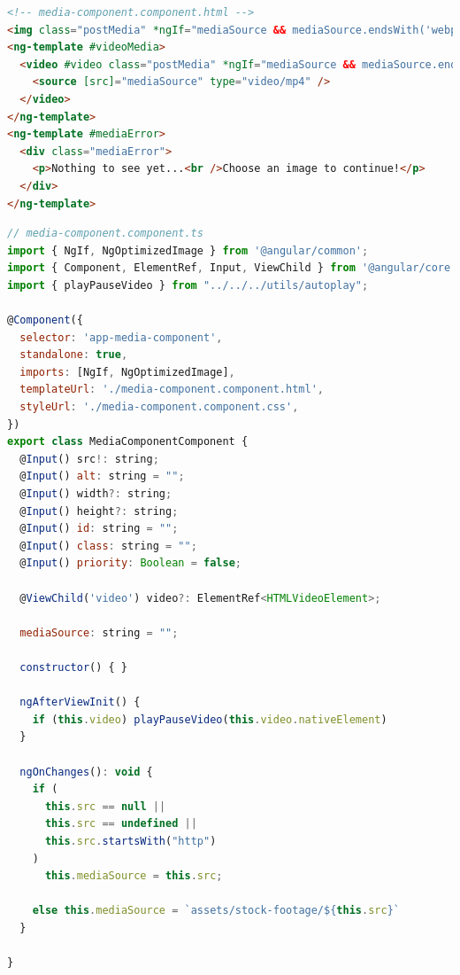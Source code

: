 \documentclass[a4paper, 10pt]{article}
\begin{document}
\begin{lstlisting}[caption=MediaComponent in Angular (Template), label={lst:Angular:MediaComponent:Template}, language=HTML]
<!-- media-component.component.html -->
<img class="postMedia" *ngIf="mediaSource && mediaSource.endsWith('webp'); else videoMedia" [ngSrc]="mediaSource" [alt]="alt" [width]="width?.endsWith('%') ? 600 : width" [height]="height || (width?.endsWith('%') ? 600 : width)" [id]="id" [class]="class" [sizes]="width!" [priority]="priority" />
<ng-template #videoMedia>
  <video #video class="postMedia" *ngIf="mediaSource && mediaSource.endsWith('mp4'); else mediaError" [attr.width]="width" controls controlslist="nodownload,nofullscreen,noremoteplayback" disablepictureinpicture loop [muted]="true" preload="metadata" >
    <source [src]="mediaSource" type="video/mp4" />
  </video>
</ng-template>
<ng-template #mediaError>
  <div class="mediaError">
    <p>Nothing to see yet...<br />Choose an image to continue!</p>
  </div>
</ng-template>
\end{lstlisting}

\begin{lstlisting}[caption=MediaComponent in Angular (Module), label={lst:Angular:MediaComponent:Module}, language=JavaScript]
// media-component.component.ts
import { NgIf, NgOptimizedImage } from '@angular/common';
import { Component, ElementRef, Input, ViewChild } from '@angular/core';
import { playPauseVideo } from "../../../utils/autoplay";

@Component({
  selector: 'app-media-component',
  standalone: true,
  imports: [NgIf, NgOptimizedImage],
  templateUrl: './media-component.component.html',
  styleUrl: './media-component.component.css',
})
export class MediaComponentComponent {
  @Input() src!: string;
  @Input() alt: string = "";
  @Input() width?: string;
  @Input() height?: string;
  @Input() id: string = "";
  @Input() class: string = "";
  @Input() priority: Boolean = false;

  @ViewChild('video') video?: ElementRef<HTMLVideoElement>;

  mediaSource: string = "";

  constructor() { }

  ngAfterViewInit() {
    if (this.video) playPauseVideo(this.video.nativeElement)
  }

  ngOnChanges(): void {
    if (
      this.src == null ||
      this.src == undefined ||
      this.src.startsWith("http")
    )
      this.mediaSource = this.src;

    else this.mediaSource = `assets/stock-footage/${this.src}`
  }

}
\end{lstlisting}
\end{document}
